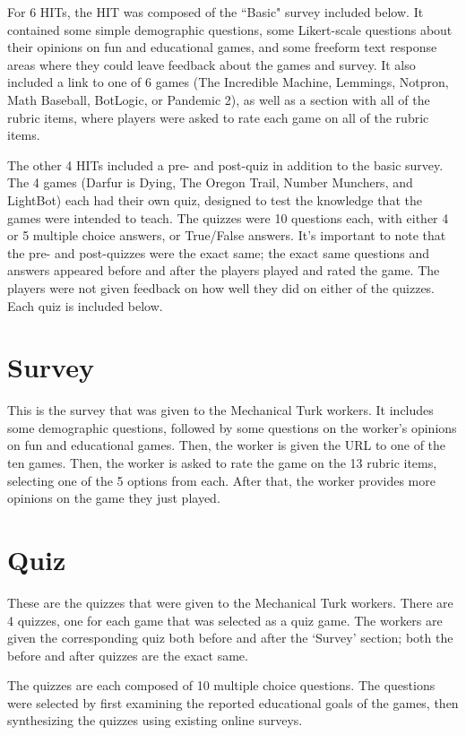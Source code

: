 		For 6 HITs, the HIT was composed of the ``Basic" survey included below. It contained some simple demographic questions, some Likert-scale questions about their opinions on fun and educational games, and some freeform text response areas where they could leave feedback about the games and survey. It also included a link to one of 6 games (The Incredible Machine, Lemmings, Notpron, Math Baseball, BotLogic, or Pandemic 2), as well as a section with all of the rubric items, where players were asked to rate each game on all of the rubric items.

		The other 4 HITs included a pre- and post-quiz in addition to the basic survey. The 4 games (Darfur is Dying, The Oregon Trail, Number Munchers, and LightBot) each had their own quiz, designed to test the knowledge that the games were intended to teach. The quizzes were 10 questions each, with either 4 or 5 multiple choice answers, or True/False answers. It's important to note that the pre- and post-quizzes were the exact same; the exact same questions and answers appeared before and after the players played and rated the game. The players were not given feedback on how well they did on either of the quizzes. Each quiz is included below.  

	\section{Survey}
		This is the survey that was given to the Mechanical Turk workers. It includes some demographic questions, followed by some questions on the worker's opinions on fun and educational games. Then, the worker is given the URL to one of the ten games. Then, the worker is asked to rate the game on the 13 rubric items, selecting one of the 5 options from each. After that, the worker provides more opinions on the game they just played.



	\section{Quiz}
		These are the quizzes that were given to the Mechanical Turk workers. There are 4 quizzes, one for each game that was selected as a quiz game. The workers are given the corresponding quiz both before and after the `Survey' section; both the before and after quizzes are the exact same.

		The quizzes are each composed of 10 multiple choice questions. The questions were selected by first examining the reported educational goals of the games, then synthesizing the quizzes using existing online surveys.





